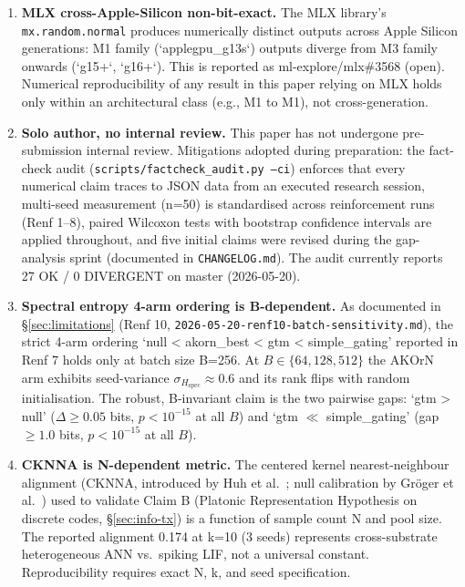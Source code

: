 \documentclass[10pt,twocolumn]{article}
\begin{document}
\begin{enumerate}
\item \textbf{MLX cross-Apple-Silicon non-bit-exact.} The MLX library's \texttt{mx.random.normal} produces numerically distinct outputs across Apple Silicon generations: M1 family (`applegpu\_g13s`) outputs diverge from M3 family onwards (`g15+`, `g16+`). This is reported as ml-explore/mlx\#3568 (open). Numerical reproducibility of any result in this paper relying on MLX holds only within an architectural class (e.g., M1 to M1), not cross-generation.

\item \textbf{Solo author, no internal review.} This paper has not undergone pre-submission internal review. Mitigations adopted during preparation: the fact-check audit (\texttt{scripts/factcheck\_audit.py --ci}) enforces that every numerical claim traces to JSON data from an executed research session, multi-seed measurement (n=50) is standardised across reinforcement runs (Renf 1--8), paired Wilcoxon tests with bootstrap confidence intervals are applied throughout, and five initial claims were revised during the gap-analysis sprint (documented in \texttt{CHANGELOG.md}). The audit currently reports 27 OK / 0 DIVERGENT on master (2026-05-20).

\item \textbf{Spectral entropy 4-arm ordering is B-dependent.} As documented in \S\ref{sec:limitations} (Renf 10, \texttt{2026-05-20-renf10-batch-sensitivity.md}), the strict 4-arm ordering `null < akorn\_best < gtm < simple\_gating' reported in Renf 7 holds only at batch size B=256. At $B \in \{64, 128, 512\}$ the AKOrN arm exhibits seed-variance $\sigma_{H_\mathrm{spec}} \approx 0.6$ and its rank flips with random initialisation. The robust, B-invariant claim is the two pairwise gaps: `gtm > null' ($\Delta \geq 0.05$ bits, $p < 10^{-15}$ at all $B$) and `gtm $\ll$ simple\_gating' (gap $\geq 1.0$ bits, $p < 10^{-15}$ at all $B$).

\item \textbf{CKNNA is N-dependent metric.} The centered kernel nearest-neighbour alignment (CKNNA, introduced by Huh et al.~\cite{huh2024platonic}; null calibration by Gröger et al.~\cite{aristotelianprh2026}) used to validate Claim B (Platonic Representation Hypothesis on discrete codes, \S\ref{sec:info-tx}) is a function of sample count N and pool size. The reported alignment 0.174 at k=10 (3 seeds) represents cross-substrate heterogeneous ANN vs.\ spiking LIF, not a universal constant. Reproducibility requires exact N, k, and seed specification.

\end{enumerate}
\end{document}
